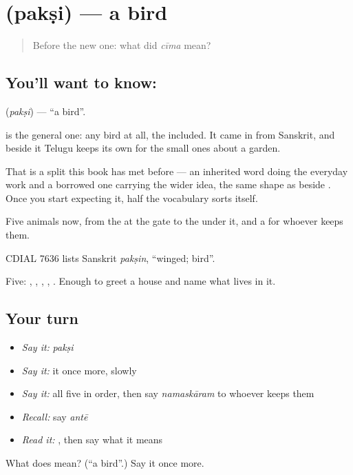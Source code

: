 \section[\texorpdfstring{\te{పక్షి} (pakṣi)}{పక్షి (pakṣi)}]{ (pakṣi) — a bird}

\label{lesson:TE-C60-bird}



\begin{quote}
Before the new one: what did \emph{cīma} mean?
\end{quote}

\subsection*{You'll want to know: }
\textbf{} (\emph{pakṣi}) — \textquotedblleft{}a bird\textquotedblright{}.

 is the general one: any bird at all, the  included. It came in from Sanskrit, and beside it Telugu keeps its own  for the small ones about a garden.

That is a split this book has met before — an inherited word doing the everyday work and a borrowed one carrying the wider idea, the same shape as  beside . Once you start expecting it, half the vocabulary sorts itself.

Five animals now, from the  at the gate to the  under it, and a  for whoever keeps them.

CDIAL 7636 lists Sanskrit \emph{pakṣin}, \textquotedblleft{}winged; bird\textquotedblright{}.

\begin{grammarlens}[title={What you've built}]
Five: , , , , . Enough to greet a house and name what lives in it.
\end{grammarlens}

\subsection*{Your turn}
\begin{itemize}
\raggedright
  \item \emph{Say it:} \emph{pakṣi}
  \item \emph{Say it:} it once more, slowly
  \item \emph{Say it:} all five in order, then say \emph{namaskāram} to whoever keeps them
  \item \emph{Recall:} say \emph{antē}
  \item \emph{Read it:} \textbf{}, then say what it means
\end{itemize}

\begin{tcolorbox}[breakable,colback=teal!4,colframe=teal!35!black,title={Before you move on}]
What does  mean? (\textquotedblleft{}a bird\textquotedblright{}.) Say it once more.
\end{tcolorbox}
